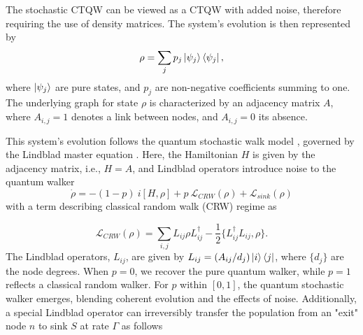 \documentclass[main.tex]{subfiles}
\begin{document}
The stochastic CTQW can be viewed as a CTQW with added noise, therefore
requiring the use of density matrices. The system's evolution is then
represented by 
\begin{equation}
    \rho = \sum_j p_j\ket{\psi_j}\bra{\psi_j},
\end{equation}
where $\ket{\psi_j}$ are pure states, and $p_j$ are non-negative
coefficients summing to one. The underlying graph for state $\rho$ is
characterized by an adjacency matrix $A$, where $A_{i,j}=1$ denotes a link
between nodes, and $A_{i,j}=0$ its absence.


This system's evolution follows the quantum stochastic walk model
\cite{whitfield2010, Caruso2014}, governed by the Lindblad master equation
\cite{Lindblad1976}. Here, the Hamiltonian $H$ is given by the 
adjacency matrix, i.e., $H=A$, and Lindblad operators introduce noise to the
quantum walker
\begin{equation}
    {\dot \rho} = -(1-p)\ i[H,\rho] + p\  \mathcal{L}_{CRW} (\rho) + \mathcal{L}_{sink} (\rho)
    \label{densityEvolution}
\end{equation}
with a term describing classical random walk (CRW) regime as

\begin{equation}
    \mathcal{L}_{CRW} (\rho) = \sum_{i,j} L_{ij} \rho L_{ij}^{\dagger} - \frac{1}{2} \{L_{ij}^\dagger L_{ij}, \rho\}.
\end{equation}
The Lindblad operators, $L_{ij}$, are given by $L_{ij} =
(A_{ij}/d_j)\ket{i}\bra{j}$, where $\lbrace d_j \rbrace$ are the node degrees.
When $p=0$, we recover the pure quantum walker, while $p=1$ reflects a
classical random walker. For $p$ within $[0,1]$, the quantum stochastic walker
emerges, blending coherent evolution and the effects of noise. Additionally, a
special Lindblad operator can irreversibly transfer the population from an
"exit" node $n$ to sink $S$ at rate $\Gamma$ as follows
\end{document}
